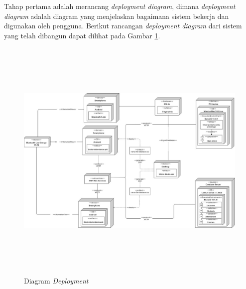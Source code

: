 \begin{enumerate}[a.]
Tahap pertama adalah merancang \textit{deployment diagram}, dimana \textit{deployment diagram} adalah diagram yang menjelaskan bagaimana sistem bekerja dan digunakan oleh pengguna. Berikut rancangan \textit{deployment diagram} dari sistem yang telah dibangun dapat dilihat pada Gambar \ref{deployment-diagram}.

\vspace{-0.2cm}
\begin{landscape}
	\begin{figure}[H]
		\center
		\includegraphics [width = 22.5cm, height=12cm]{gambar/model/deployment-diagram}
		\caption{Diagram \textit{Deployment}}
		\label{deployment-diagram}
	\end{figure}
\end{landscape}


\end{enumerate}
